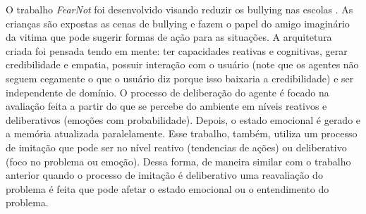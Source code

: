 O trabalho \emph{FearNot} foi desenvolvido visando reduzir os bullying nas
escolas \cite{dias2005feeling}. As crianças são expostas as cenas de bullying
e fazem o papel do amigo imaginário da vitima que pode sugerir formas de ação
para as situações. A arquitetura criada foi pensada tendo em
mente: ter capacidades reativas e cognitivas, gerar credibilidade e empatia,
possuir interação com o usuário (note que os agentes não seguem cegamente o que
o usuário diz porque isso baixaria a credibilidade) e ser independente de
domínio.
%
O processo de deliberação do agente é focado na avaliação feita a partir do
que se percebe do ambiente em níveis reativos e deliberativos (emoções com
probabilidade). Depois, o estado emocional é gerado e a memória atualizada
paralelamente. Esse trabalho, também, utiliza um processo de imitação que pode
ser no nível reativo (tendencias de ações) ou deliberativo (foco no problema
ou emoção). Dessa forma, de maneira similar com o trabalho anterior quando o
processo de imitação é deliberativo uma reavaliação do problema é feita que
pode afetar o estado emocional ou o entendimento do problema.

